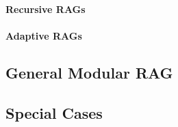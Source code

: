 \paragraph{Recursive RAGs}
\label{sec:recursive}

\paragraph{Adaptive RAGs}
\label{sec:adaptive}

\subsection{General Modular RAG}
\label{sec:modular_rag}

\subsection{Special Cases}
\label{sec:special_cases}
